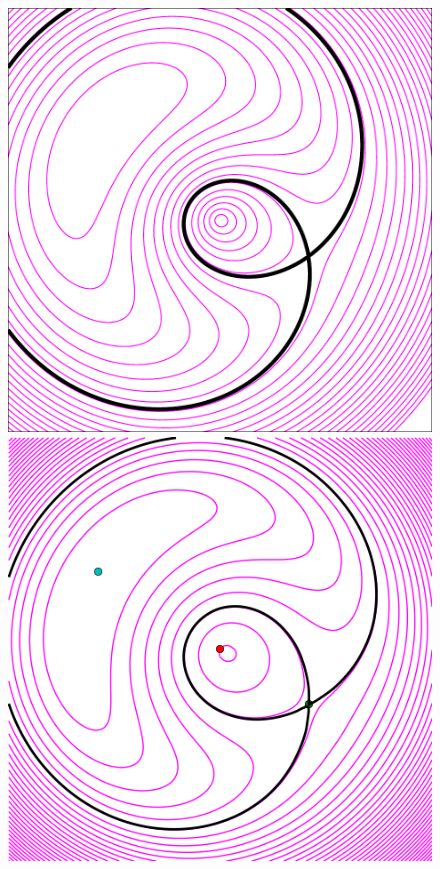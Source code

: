 \documentclass[usenatbib]{mn2e}
\newlength{\myplotswidth}
\begin{document}
\begin{figure}
  \includegraphics[width=\myplotswidth]{fig/ASW000102p_006941_arriv}
  \includegraphics[width=\myplotswidth]{fig/006941_spaghetti} \\

\end{figure}
\end{document}
